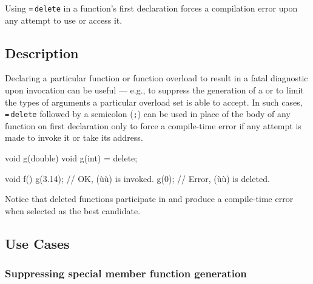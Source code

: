 
Using \lstinline!=!\,\lstinline!delete! in a function's first declaration
forces a compilation error upon any attempt to use or access it.

\subsection[Description]{Description}\label{description}

Declaring a particular function or function overload to result in a
fatal diagnostic upon invocation can be useful --- e.g., to suppress the
generation of a  or to limit the types of
arguments a particular overload set is able to accept. In such cases,
\lstinline!=!\,\lstinline!delete! followed by a semicolon (\lstinline!;!) can be used in place of the body of any
function on first declaration only to force a compile-time error if
any attempt is made to invoke it or take its address.

\begin{emcppslisting}
void g(double) { }
void g(int) = delete;

void f()
{
    g(3.14);  // OK, (ù{}ù) is invoked.
    g(0);     // Error, (ù{}ù) is deleted.
}
\end{emcppslisting}

\noindent Notice that deleted functions participate in 
and produce a compile-time error when selected as the best candidate.

\subsection[Use Cases]{Use Cases}\label{use-cases}

\subsubsection[Suppressing special member function generation]{Suppressing special member function generation}\label{suppressing-special-member-function-generation}

